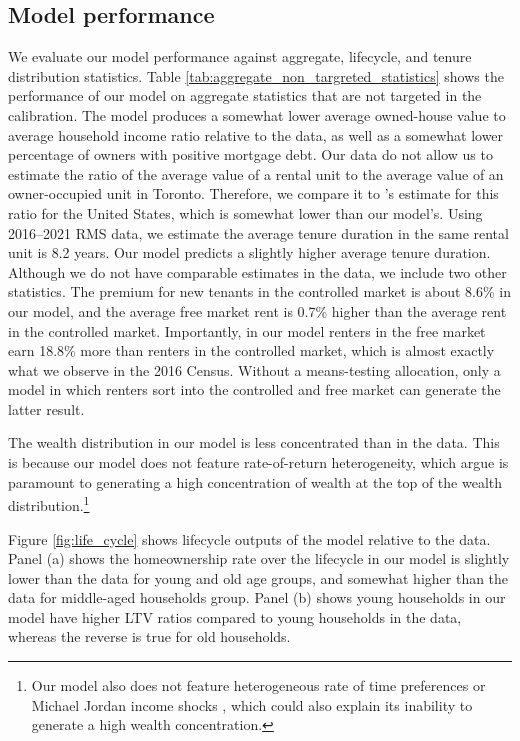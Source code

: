 \documentclass[parskip=full]{article}
\begin{document}
\subsection{Model performance}\label{subsection:non_targeted_statistics}

We evaluate our model performance against aggregate, lifecycle, and tenure distribution statistics. Table \ref{tab:aggregate_non_targreted_statistics} shows the performance of our model on aggregate statistics that are not targeted in the calibration. The model produces a somewhat lower average owned-house value to average household income ratio relative to the data, as well as a somewhat lower percentage of owners with positive mortgage debt. Our data do not allow us to estimate the ratio of the average value of a rental unit to the average value of an owner-occupied unit in Toronto. Therefore, we compare it to \citet{chatterjee-eyigungor-2015}'s estimate for this ratio for the United States, which is somewhat lower than our model's. Using 2016--2021 RMS data, we estimate the average tenure duration in the same rental unit is 8.2 years. Our model predicts a slightly higher average tenure duration. Although we do not have comparable estimates in the data, we include two other statistics. The premium for new tenants in the controlled market is about 8.6\% in our model, and the average free market rent is 0.7\% higher than the average rent in the controlled market. Importantly, in our model renters in the free market earn 18.8\% more than renters in the controlled market, which is almost exactly what we observe in the 2016 Census. Without a means-testing allocation, only a model in which renters sort into the controlled and free market can generate the latter result.

The wealth distribution in our model is less concentrated than in the data. This is because our model does not feature rate-of-return heterogeneity, which \citet{fagereng} argue is paramount to generating a high concentration of wealth at the top of the wealth distribution.\footnote{Our model also does not feature heterogeneous rate of time preferences \citep{ks-1998} or Michael Jordan income shocks \citet{mj-shocks}, which could also explain its inability to generate a high wealth concentration.}

Figure \ref{fig:life_cycle} shows lifecycle outputs of the model relative to the data. Panel (a) shows the homeownership rate over the lifecycle in our model is slightly lower than the data for young and old age groups, and somewhat higher than the data for middle-aged households group. Panel (b) shows young households in our model have higher LTV ratios compared to young households in the data, whereas the reverse is true for old households. 
\end{document}
